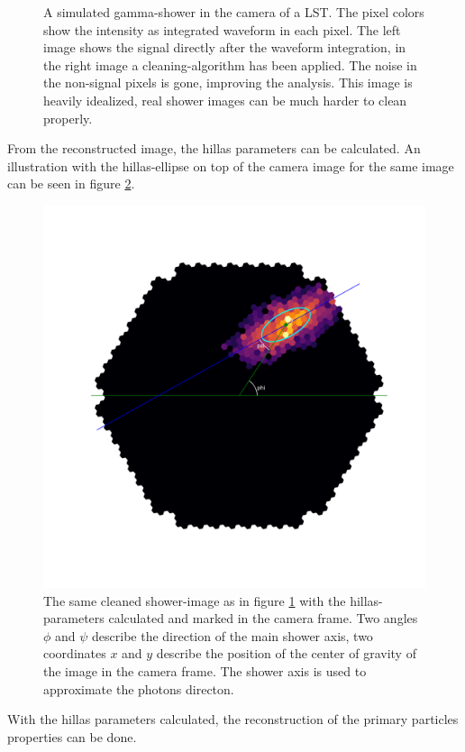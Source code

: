\begin{figure}
\begin{subfigure}{.5\textwidth}
	\end{subfigure}
	\caption{A simulated gamma-shower in the camera of a LST.
		The pixel colors show the intensity as integrated 
		waveform in each pixel. The left image 
		shows the signal directly after
		the waveform integration, in the right image
		a cleaning-algorithm has been 
		applied. The noise in the non-signal pixels is gone,
		improving the analysis.
		This image is heavily idealized, real shower images 
		can be much harder to clean properly.}
	\label{fig:shower_cleaning}
\end{figure}

From the reconstructed image, the hillas parameters can be calculated.
An illustration with the hillas-ellipse on top of the camera image 
for the same image can be seen in figure \ref{fig:hillas_params}.

\begin{figure}
	\centering
	\includegraphics[width=.8\textwidth]{Plots/hillas_cleaned_params.pdf}
	\caption{The same cleaned shower-image as in figure \ref{fig:shower_cleaning}
	with the hillas-parameters calculated and marked in the camera frame.
	Two angles $\phi$ and $\psi$ describe the direction of the 
	main shower axis, two coordinates $x$ and $y$ describe the position of 
	the center of gravity of the image in the camera frame.
	The shower axis is used to approximate the photons directon.}
	\label{fig:hillas_params}
\end{figure}

With the hillas parameters calculated, the reconstruction of the 
primary particles properties can be done.

